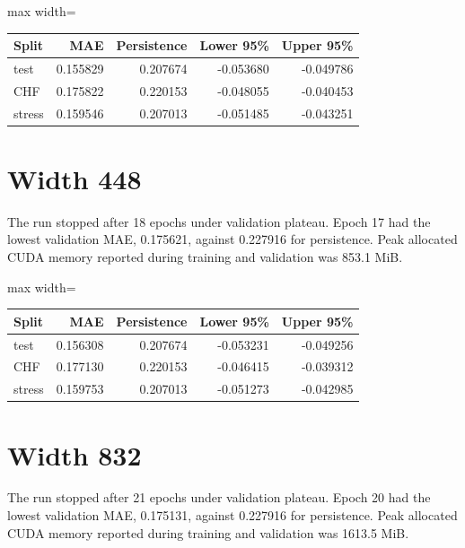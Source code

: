 \documentclass[11pt,oneside,openany]{book}
\begin{document}
\begin{center}\footnotesize\sffamily\setlength{\tabcolsep}{3.5pt}\renewcommand{\arraystretch}{1.2}
\begin{adjustbox}{max width=\linewidth}\begin{tabular}{@{}lrrrr@{}}\toprule
Split & MAE & Persistence & Lower 95\% & Upper 95\% \\ \midrule
test & 0.155829 & 0.207674 & -0.053680 & -0.049786 \\
CHF & 0.175822 & 0.220153 & -0.048055 & -0.040453 \\
stress & 0.159546 & 0.207013 & -0.051485 & -0.043251 \\
\bottomrule\end{tabular}\end{adjustbox}\end{center}
\section*{Width 448}
The run stopped after 18 epochs under validation plateau. Epoch 17 had the lowest validation MAE, 0.175621, against 0.227916 for persistence. Peak allocated CUDA memory reported during training and validation was 853.1 MiB.

\begin{center}\footnotesize\sffamily\setlength{\tabcolsep}{3.5pt}\renewcommand{\arraystretch}{1.2}
\begin{adjustbox}{max width=\linewidth}\begin{tabular}{@{}lrrrr@{}}\toprule
Split & MAE & Persistence & Lower 95\% & Upper 95\% \\ \midrule
test & 0.156308 & 0.207674 & -0.053231 & -0.049256 \\
CHF & 0.177130 & 0.220153 & -0.046415 & -0.039312 \\
stress & 0.159753 & 0.207013 & -0.051273 & -0.042985 \\
\bottomrule\end{tabular}\end{adjustbox}\end{center}
\section*{Width 832}
The run stopped after 21 epochs under validation plateau. Epoch 20 had the lowest validation MAE, 0.175131, against 0.227916 for persistence. Peak allocated CUDA memory reported during training and validation was 1613.5 MiB.
\end{document}
